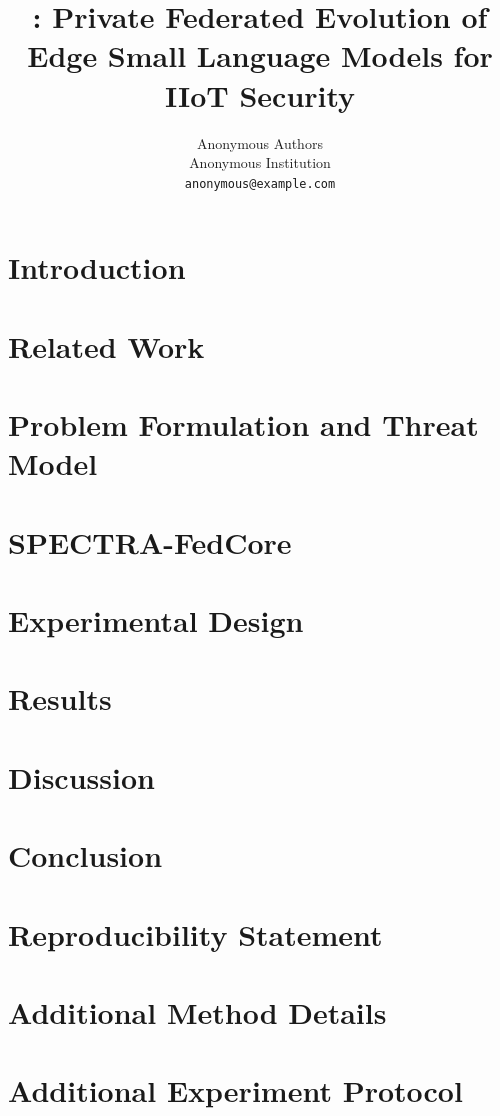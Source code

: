 \documentclass[10pt]{article}
\title{\method: Private Federated Evolution of Edge Small Language Models for IIoT Security}
\author{
Anonymous Authors\\
\small Anonymous Institution\\
\small \texttt{anonymous@example.com}
}
\date{}
\newcommand{\method}{SPECTRA-FedCore}
\begin{document}
\maketitle



\section{Introduction}
\label{sec:introduction}


\section{Related Work}
\label{sec:related}


\section{Problem Formulation and Threat Model}
\label{sec:problem}


\section{\method}
\label{sec:method}


\section{Experimental Design}
\label{sec:experiments}


\section{Results}
\label{sec:results}


\section{Discussion}
\label{sec:discussion}


\section{Conclusion}
\label{sec:conclusion}


\section*{Reproducibility Statement}





\appendix
\section{Additional Method Details}
\label{app:method}


\section{Additional Experiment Protocol}
\label{app:protocol}

\end{document}
